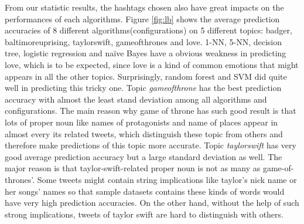 \documentclass[letterpaper,11pt,twocolumn]{article}
\begin{document}
\begin{figure*}[!htb]
\centering
{}
\caption{Prediction Accuracies on 5 Different Labels}
\label{fig:lb}
\end{figure*}

From our statistic results, the hashtags chosen also have great impacts on the performances of each algorithms. Figure \ref{fig:lb} shows the average prediction accuracies of 8 different algorithms(configurations) on 5 different topics: badger, baltimoreuprising, taylorswift, gameofthrones and love. 1-NN, 5-NN, decision tree, logistic regression and na{\"i}ve Bayes have a obvious weakness in predicting love, which is to be expected, since love is a kind of common emotions that might appears in all the other topics. Surprisingly, random forest and SVM did quite well in predicting this tricky one. Topic \emph{gameofthrone} has the best prediction accuracy with almost the least stand deviation among all algorithms and configurations. The main reason why game of throne has such good result is that lots of proper noun like names of protagonists and name of places appear in almost every its related tweets, which distinguish these topic from others and therefore make predictions of this topic more accurate. Topic \emph{taylorswift} has very good average prediction accuracy but a large standard deviation as well. The major reason is that taylor-swift-related proper noun is not as many as game-of-thrones'. Some tweets might contain string implications like taylor's nick name or her songs' names so that sample datasets contains these kinds of words would have very high prediction accuracies. On the other hand, without the help of such strong implications, tweets of taylor swift are hard to distinguish with others.
\end{document}
